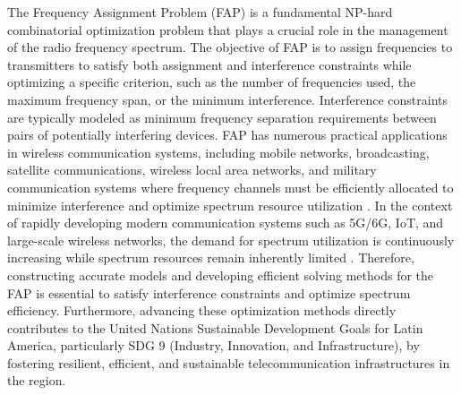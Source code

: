 \documentclass[letterpaper,journal]{IEEEtran}
\begin{document}
The Frequency Assignment Problem (FAP) is a fundamental NP-hard combinatorial optimization problem \cite{murphey1999fap,Aardal2007,Mahmoudi2023} that plays a crucial role in the management of the radio frequency spectrum. The objective of FAP is to assign frequencies to transmitters to satisfy both assignment and interference constraints while optimizing a specific criterion, such as the number of frequencies used, the maximum frequency span, or the minimum interference.
Interference constraints are typically modeled as minimum frequency separation requirements between pairs of potentially interfering devices. 
FAP has numerous practical applications in wireless communication systems, including mobile networks, broadcasting, satellite communications, wireless local area networks, and military communication systems where frequency channels must be efficiently allocated to minimize interference and optimize spectrum resource utilization \cite{Aardal2007,Mahmoudi2023}. 
In the context of rapidly developing modern communication systems such as 5G/6G, IoT, and large-scale wireless networks, the demand for spectrum utilization is continuously increasing while spectrum resources remain inherently limited \cite{Mondal2024,Cuellar2024,Alhussien2024}. 
Therefore, constructing accurate models and developing efficient solving methods for the FAP is essential to satisfy interference constraints and optimize spectrum efficiency. 
Furthermore, advancing these optimization methods directly contributes to the United Nations Sustainable Development Goals for Latin America, particularly SDG 9 (Industry, Innovation, and Infrastructure), by fostering resilient, efficient, and sustainable telecommunication infrastructures in the region.
\end{document}
